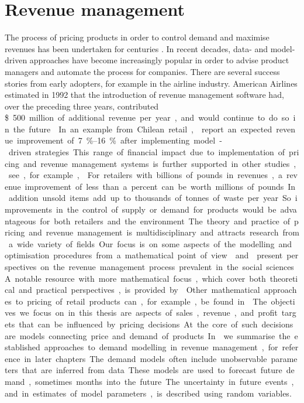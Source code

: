 \documentclass[main.tex]{subfiles}
\begin{document}
\section{Revenue management}

The process of pricing products in order to control demand and
maximise revenues has been undertaken for centuries
\citep[Book~1]{smith1776inquiry}. In recent
decades, data- and model-driven approaches have become increasingly
popular in order to advise product managers and automate the process for companies.
There are several success stories from early adopters, for example in
the airline industry.
American Airlines estimated in 1992 that the introduction of revenue
management software had, over the preceding three
years, contributed \SI{500}[\$] million of additional revenue per year,
and would continue to do so in the future \citep{smith1992yield}.
In an example from Chilean retail, \citet{bitran1998coordinating}
report an expected revenue improvement of \SIrange{7}{16}{\percent} after implementing
model-driven strategies.
This range of financial impact due to implementation of pricing and revenue
management systems is further supported in other studies, see, for example, \citet[Ch.~1.2]{phillips2005pricing}.
For retailers with billions of pounds in revenues, a revenue improvement of
less than a percent can be worth millions of pounds.
In addition unsold items add up to thousands of tonnes of waste per year. So
improvements in the control of supply or demand for products would be advantageous
for both retailers and the environment.

The theory and practice of pricing and revenue management is
multidisciplinary and attracts research from a wide variety of
fields. Our focus is on some aspects of the modelling and
optimisation procedures from a mathematical point of view.
\citet{phillips2005pricing} and \citet{ozer2012oxford} present perspectives on the
revenue management process prevalent in the social sciences.
A notable resource with more mathematical focus, which
cover both theoretical and practical
perspectives, is provided by \citet{talluri2006theory}.
Other mathematical approaches to pricing of retail products
can, for example, be found in \citet{butler2014customer}.

The objectives we focus on in this thesis are aspects of sales,
revenue, and profit targets that can be influenced by pricing
decisions.  At the core of such decisions are models connecting price
and demand of products.  In  we summarise
the established approaches to demand modelling in revenue management, for
reference in later chapters.  The demand models often include
unobservable parameters that are inferred from data.  These models are
used to forecast future demand, sometimes months into the future.  The
uncertainty in future events, and in estimates of model parameters, is
described using random variables.
\end{document}
